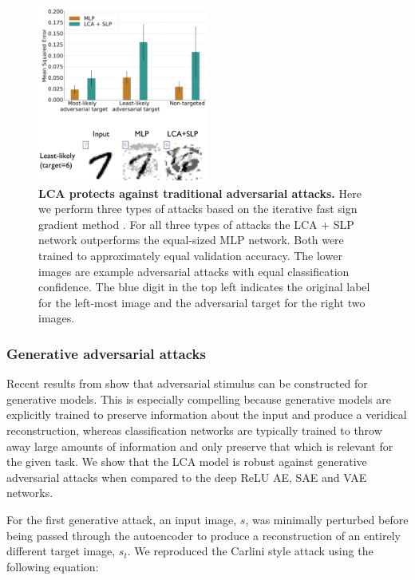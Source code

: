 \begin{figure}
    \centering
    \includegraphics[width=0.5\textwidth]{figures/adversarial_mlp_lca_slp.png}
    \caption{\textbf{LCA protects against traditional adversarial attacks.} Here we perform three types of attacks based on the iterative fast sign gradient method \parencite{kurakin2016adversarial, kos2018adversarial}. For all three types of attacks the LCA + SLP network outperforms the equal-sized MLP network. Both were trained to approximately equal validation accuracy. The lower images are example adversarial attacks with equal classification confidence. The blue digit in the top left indicates the original label for the left-most image and the adversarial target for the right two images.}
    \label{fig:ch4_adversarial_mlp_vs_lca}
\end{figure}


\subsubsection{Generative adversarial attacks}
Recent results from \parencite{kos2018adversarial, gondim2018adversarial, goodfellow2014explaining} show that adversarial stimulus can be constructed for generative models. This is especially compelling because generative models are explicitly trained to preserve information about the input and produce a veridical reconstruction, whereas classification networks are typically trained to throw away large amounts of information and only preserve that which is relevant for the given task. We show that the LCA model is robust against generative adversarial attacks when compared to the deep ReLU AE, SAE \parencite{ng2011sparse} and VAE \parencite{kingma2013auto} networks.

For the first generative attack, an input image, $s$, was minimally perturbed before being passed through the autoencoder to produce a reconstruction of an entirely different target image, $s_{t}$. We reproduced the Carlini style attack \parencite{carlini2017towards, kos2018adversarial} using the following equation:


